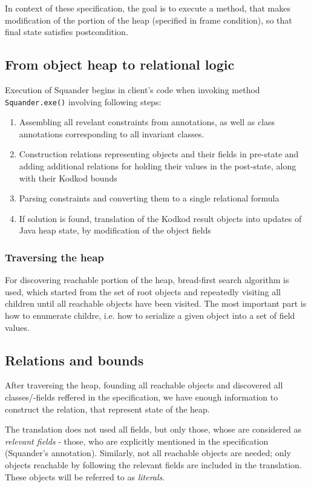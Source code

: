 \documentclass[11pt,twoside,a4paper]{book}
\begin{document}
In context of these specification, the goal is to execute a method, that makes
modification of the portion of the heap (specified in frame condition), so that
final state satisfies postcondition.

\subsection{From object heap to relational logic}

Execution of Squander begins in client's code when invoking
method \verb|Squander.exe()| involving following steps:

\begin{enumerate}
  \item Assembling all revelant constraints from annotations, as well as class
  annotations corresponding to all invariant classes.
  \item Construction relations representing objects and their fields in
  pre-state and adding additional relations for holding their values in the
  post-state, along with their Kodkod bounds
  \item Parsing constraints and converting them to a single relational formula
  \item If solution is found, translation of the Kodkod result objects into
  updates of Java heap state, by modification of the object fields
\end{enumerate}

\subsubsection{Traversing the heap}

For discovering reachable portion of the heap, bread-first search algorithm is
used, which started from the set of root objects and repeatedly visiting all
children until all reachable objects have been visited. The most important part
is how to enumerate childre, i.e. how to serialize a given object into a set of
field values.

\subsection{Relations and bounds}
After traversing the heap, founding all reachable objects and
discovered all classes/-fields reffered in the specification, we have enough
information to construct the relation, that represent state of the heap.

The translation does not used all fields, but only those, whose are considered
as \textit{relevant fields} - those, who are explicitly mentioned in the
specification (Squander's annotation). Similarly, not all reachable objects are
needed; only objects reachable by following the relevant fields are included in
the translation. These objects will be referred to as \textit{literals}.
\end{document}
